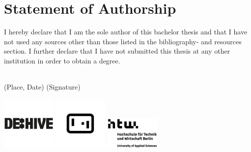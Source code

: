 \documentclass[a4paper, twoside, 10pt]{report}
\begin{document}
\chapter*{Statement of Authorship}
I hereby declare that I am the sole author of this bachelor thesis and that I have not used any sources other than those listed in the bibliography- and resources section. I further declare that I have not submitted this thesis at any other institution in order to obtain a degree.
\begin{spacing}{5}
\null
\begin{spacing}{1}
\noindent
\dotfill \space \space \dotfill \\
(Place, Date) \hfill (Signature)\hfill \null
\end{spacing}
\end{spacing}



\newpage
\pagestyle{empty}
\centering
\vspace*{\fill}
\includegraphics[width=0.2\textwidth]{Images/logos/logo_dehive.jpg} \hspace*{\fill}
\includegraphics[width=0.2\textwidth]{Images/logos/logo_GD_black.jpg} \hspace*{\fill}
\includegraphics[width=0.2\textwidth]{Images/logos/logo_htw.jpg}

\ifdefined{}
\clearpage
\null
\fi

\ifdefined{}

\clearpage
\null
\newpage
\clearpage
\clearpage
\end{document}
